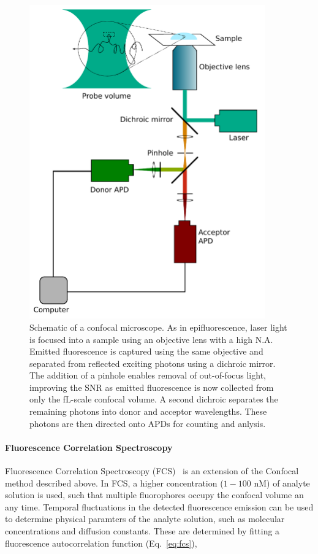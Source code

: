 \begin{figure}
	\begin{center}
	\includegraphics*[clip=true, width=4in]{introduction/confocal.pdf}
	\caption{Schematic of a confocal microscope. As in epifluorescence, laser light is focused into a sample using an objective lens with a high N.A. Emitted fluorescence is captured using the same objective and separated from reflected exciting photons using a dichroic mirror. The addition of a pinhole enables removal of out-of-focus light, improving the SNR as emitted fluorescence is now collected from only the fL-scale confocal volume. A second dichroic separates the remaining photons into donor and acceptor wavelengths. These photons are then directed onto APDs for counting and anlysis.}
	\label{fig:confocal}
	\end{center}
\end{figure}

\paragraph{Fluorescence Correlation Spectroscopy}
Fluorescence Correlation Spectroscopy (FCS)~\cite{Magde1972} is an extension of the Confocal method described above. In FCS, a higher concentration ($1 - 100$ nM) of analyte solution is used, such that multiple fluorophores occupy the confocal volume an any time. Temporal fluctuations in the detected fluorescence emission can be used to determine physical paramters of the analyte solution, such as molecular concentrations and diffusion constants. These are determined by fitting a fluorescence autocorrelation function (Eq.~\ref{eq:fcs}), 


